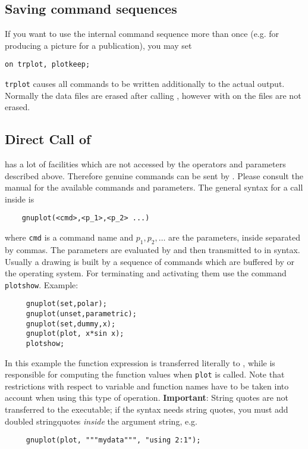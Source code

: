 \subsection{Saving {\Gnuplot} command sequences}
\hypertarget{switch:TRPLOT}{}
\hypertarget{switch:PLOTKEEP}{}
If you want to use the internal {\Gnuplot} command sequence more than once
(e.g. for producing a picture for a publication), you may set
\begin{verbatim}
on trplot, plotkeep;
\end{verbatim}
\texttt{trplot} causes all {\Gnuplot} commands to be written additionally to the
actual {\REDUCE} output.  Normally the data files are erased after calling
{\Gnuplot}, however with  on the files are not erased.


\subsection{Direct Call of {\Gnuplot}}
\hypertarget{command:GNUPLOT}{}

{\Gnuplot} has a lot of facilities which are not accessed by the operators and
parameters described above. Therefore genuine {\Gnuplot} commands can be sent by
{\REDUCE}.  Please consult the {\Gnuplot} manual for the available commands and
parameters. The general syntax for a {\Gnuplot} call inside {\REDUCE} is
\begin{verbatim}
    gnuplot(<cmd>,<p_1>,<p_2> ...)
\end{verbatim}
where \texttt{cmd} is a command name and $p_1,p_2, \ldots$ are the parameters,
inside {\REDUCE} separated by commas. The parameters are evaluated by {\REDUCE}
and then transmitted to {\Gnuplot} in {\Gnuplot} syntax. Usually a drawing is built by
a sequence of commands which are buffered by {\REDUCE} or the operating
system. For terminating and activating them use the {\REDUCE}
command \texttt{plotshow}.
\hypertarget{command:PLOTSHOW}{}
Example:
\begin{verbatim}
     gnuplot(set,polar);
     gnuplot(unset,parametric);
     gnuplot(set,dummy,x);
     gnuplot(plot, x*sin x);
     plotshow;
\end{verbatim}
In this example the function expression is transferred literally to {\Gnuplot},
while {\REDUCE} is responsible for computing the function values
when \texttt{plot} is called.  Note that {\Gnuplot} restrictions with respect to
variable and function names have to be taken into account when using this type
of operation. \textbf{Important}: String quotes are not transferred to the {\Gnuplot}
executable; if the {\Gnuplot} syntax needs string quotes, you must add doubled
stringquotes \emph{inside} the argument string, e.g.
\begin{verbatim}
     gnuplot(plot, """mydata""", "using 2:1");
\end{verbatim}


